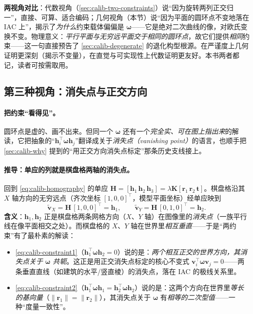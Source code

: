 \begin{insight}
\textbf{两视角对比}：代数视角（\cref{sec:calib-two-constraints}）说“因为旋转两列正交归一”，直接、可算、适合编码；几何视角（本节）说“因为平面的圆环点不变地落在 IAC 上”，揭示了\emph{为什么}约束载体偏偏是 $\boldsymbol{\omega}$——它是绝对二次曲线的像，对欧氏变换不变。物理意义：\emph{平行平面与无穷远平面交于相同的圆环点}，故它们提供\emph{相同}约束——这一句直接预告了 \cref{sec:calib-degenerate} 的退化构型根源。在严谨度上几何证明更深刻（揭示不变量），在直觉与可实现性上代数证明更友好。本书两者都记，读者可按需取用。
\end{insight}

\subsection{第三种视角：消失点与正交方向}
\label{sec:calib-vanishing}

\paragraph{把约束“看得见”。}
圆环点是虚的、画不出来。但同一个 $\boldsymbol{\omega}$ 还有一个\emph{完全实、可在图上指出来}的解读，它把抽象的“$\mathbf{h}_i^\top\boldsymbol{\omega}\mathbf{h}_j$”翻译成关于\emph{消失点（vanishing point）}的语言，也顺手把 \cref{sec:calib-why} 提到的“用正交方向消失点标定”那条历史支线接上。

\paragraph{推导：单应的列就是棋盘格两轴的消失点。}
回到 \cref{eq:calib-homography} 的单应 $\mathbf{H}=[\mathbf{h}_1\,\mathbf{h}_2\,\mathbf{h}_3]=\lambda\mathbf{K}[\mathbf{r}_1\,\mathbf{r}_2\,\mathbf{t}]$。棋盘格沿其 $X$ 轴方向的无穷远点（齐次坐标 $[1,0,0]^\top$，模型平面坐标）经单应映到
\begin{equation}
  \tilde{\mathbf{v}}_X = \mathbf{H}\,[1,0,0]^\top = \mathbf{h}_1,
  \qquad
  \tilde{\mathbf{v}}_Y = \mathbf{H}\,[0,1,0]^\top = \mathbf{h}_2.
  \label{eq:calib-vanishing}
\end{equation}
\textbf{含义}：$\mathbf{h}_1,\mathbf{h}_2$ 正是棋盘格两条网格方向（$X$、$Y$ 轴）在图像里的\emph{消失点}（一族平行线在像平面相交之处）。而棋盘格的 $X$、$Y$ 轴在世界里\emph{相互垂直}——于是“两约束”有了最朴素的解读：

\begin{itemize}
  \item \cref{eq:calib-constraint1}（$\mathbf{h}_1^\top\boldsymbol{\omega}\mathbf{h}_2=0$）说的是：\emph{两个相互正交的世界方向，其消失点关于 $\boldsymbol{\omega}$ 共轭}。这正是用正交消失点标定的核心不变式 $\mathbf{v}_i^\top\boldsymbol{\omega}\mathbf{v}_j=0$\cite{hartley2004multiview}——两条垂直直线（如建筑的水平/竖直棱）的消失点，落在 IAC 的极线关系里。
  \item \cref{eq:calib-constraint2}（$\mathbf{h}_1^\top\boldsymbol{\omega}\mathbf{h}_1=\mathbf{h}_2^\top\boldsymbol{\omega}\mathbf{h}_2$）说的是：这两个方向在世界里\emph{等长的基向量}（$\|\mathbf{r}_1\|=\|\mathbf{r}_2\|$），其消失点关于 $\boldsymbol{\omega}$ 有\emph{相等的二次型值}——一种“度量一致性”。
\end{itemize}

